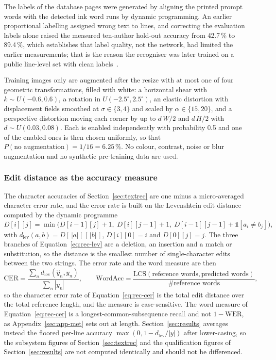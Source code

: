 The labels of the database pages were generated by aligning the printed prompt words with the detected ink word runs by dynamic programming.
An earlier proportional labelling assigned wrong text to lines, and correcting the evaluation labels alone raised the measured ten-author hold-out accuracy from 42.7\,\% to 89.4\,\%, which establishes that label quality, not the network, had limited the earlier measurements; that is the reason the recogniser was later trained on a public line-level set with clean labels~\cite{mamun2024}.

Training images only are augmented after the resize with at most one of four geometric transformations, filled with white: a horizontal shear with $k\sim U(-0.6,0.6)$, a rotation in $U(-2.5^\circ,2.5^\circ)$, an elastic distortion with displacement fields smoothed at $\sigma\in\{3,4\}$ and scaled by $\alpha\in\{15,20\}$, and a perspective distortion moving each corner by up to $d\,W/2$ and $d\,H/2$ with $d\sim U(0.03,0.08)$.
Each is enabled independently with probability 0.5 and one of the enabled ones is then chosen uniformly, so that $P(\text{no augmentation})=1/16=6.25\,\%$.
No colour, contrast, noise or blur augmentation and no synthetic pre-training data are used.

\subsubsection{Edit distance as the accuracy measure}

The character accuracies of Section~\ref{sec:textrec} are one minus a micro-averaged character error rate, and the error rate is built on the Levenshtein edit distance computed by the dynamic programme
\begin{equation}
D[i][j]=\min\bigl(D[i-1][j]+1,\;D[i][j-1]+1,\;D[i-1][j-1]+\mathbb 1[a_i\ne b_j]\bigr),\label{eq:rec-lev}
\end{equation}
with $d_{\mathrm{lev}}(a,b)=D[\,\lvert a\rvert\,][\,\lvert b\rvert\,]$, $D[i][0]=i$ and $D[0][j]=j$.
The three branches of Equation~\ref{eq:rec-lev} are a deletion, an insertion and a match or substitution, so the distance is the smallest number of single-character edits between the two strings.
The error rate and the word measure are then
\begin{equation}
\mathrm{CER}=\frac{\sum_nd_{\mathrm{lev}}(\hat y_n,y_n)}{\sum_n|y_n|},\qquad
\mathrm{WordAcc}=\frac{\mathrm{LCS}(\text{reference words},\text{predicted words})}{\#\text{reference words}},\label{eq:rec-cer}
\end{equation}
so the character error rate of Equation~\ref{eq:rec-cer} is the total edit distance over the total reference length, and the measure is case-sensitive.
The word measure of Equation~\ref{eq:rec-cer} is a longest-common-subsequence recall and not $1-\mathrm{WER}$, as Appendix~\ref{sec:app-met} sets out at length.
Section~\ref{sec:results} averages instead the floored per-line accuracy $\max(0,1-d_{\mathrm{lev}}/|y|)$ after lower-casing, so the subsystem figures of Section~\ref{sec:textrec} and the qualification figures of Section~\ref{sec:results} are not computed identically and should not be differenced.
